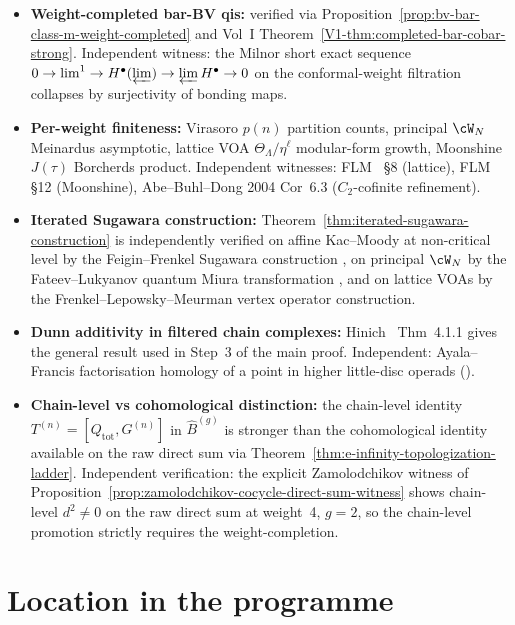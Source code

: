 \begin{itemize}[nosep]
\item \textbf{Weight-completed bar-BV qis:} verified via
Proposition~\ref{prop:bv-bar-class-m-weight-completed} and Vol~I
Theorem~\ref{V1-thm:completed-bar-cobar-strong}. Independent witness:
the Milnor short exact sequence $0 \to \mathrm{lim}^1 \to H^\bullet(\varprojlim)
\to \varprojlim H^\bullet \to 0$ on the conformal-weight filtration
collapses by surjectivity of bonding maps.
\item \textbf{Per-weight finiteness:} Virasoro $p(n)$ partition
counts, principal $\cW_N$ Meinardus asymptotic, lattice VOA
$\Theta_\Lambda/\eta^\ell$ modular-form growth, Moonshine $J(\tau)$
Borcherds product. Independent witnesses: FLM~\cite{FLM88} \S 8
(lattice), FLM~\cite{FLM88} \S 12 (Moonshine), Abe--Buhl--Dong
2004 Cor~6.3 ($C_2$-cofinite refinement).
\item \textbf{Iterated Sugawara construction:}
Theorem~\ref{thm:iterated-sugawara-construction} is independently
verified on affine Kac--Moody at non-critical level by the
Feigin--Frenkel Sugawara construction
\cite{FF90}, on principal $\cW_N$ by the Fateev--Lukyanov quantum
Miura transformation \cite{FL88}, and on lattice VOAs by the
Frenkel--Lepowsky--Meurman vertex operator construction.
\item \textbf{Dunn additivity in filtered chain complexes:}
Hinich~\cite{Hin15} Thm~4.1.1 gives the general result used in Step~3
of the main proof. Independent: Ayala--Francis factorisation homology
of a point in higher little-disc operads (\cite{AF15}).
\item \textbf{Chain-level vs cohomological distinction:} the
chain-level identity
$T^{(n)} = [Q_{\mathrm{tot}}, G^{(n)}]$ in
$\widehat{B}^{(g)}$ is stronger than the cohomological identity
available on the raw direct sum via
Theorem~\ref{thm:e-infinity-topologization-ladder}. Independent
verification: the explicit Zamolodchikov witness of
Proposition~\ref{prop:zamolodchikov-cocycle-direct-sum-witness} shows
chain-level $d^2 \neq 0$ on the raw direct sum at weight~4, $g = 2$,
so the chain-level promotion strictly requires the weight-completion.
\end{itemize}

\section{Location in the programme}
\label{sec:weight-completed-topologization-location}

